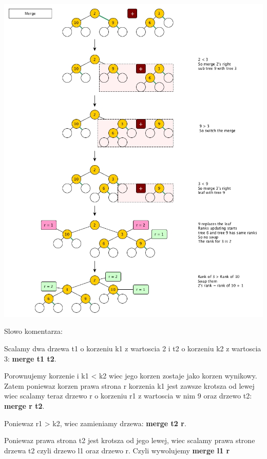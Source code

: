 \documentclass{article}
\begin{document}
\begin{center}
    \begin{minipage}[h]{0.8\textwidth}
        \centering
        \includegraphics[width=1.0\textwidth]{left_merge.png}
    \end{minipage}    
\end{center}

Slowo komentarza:

Scalamy dwa drzewa t1 o korzeniu k1 z wartoscia 2 i t2 o korzeniu k2 z wartoscia 3: \textbf{merge t1 t2}. 

Porownujemy korzenie i k1 < k2 wiec jego korzen zostaje jako korzen wynikowy. Zatem poniewaz korzen prawa strona r korzenia k1 jest zawsze krotsza od lewej wiec scalamy teraz drzewo r o korzeniu r1 z wartoscia w nim 9 oraz drzewo t2: \textbf{merge r t2}.

Poniewaz r1 > k2, wiec zamieniamy drzewa: \textbf{merge t2 r}.

Poniewaz prawa strona t2 jest krotsza od jego lewej, wiec scalamy prawa strone drzewa t2 czyli drzewo l1 oraz drzewo r. Czyli wywolujemy \textbf{merge l1 r}
\end{document}
